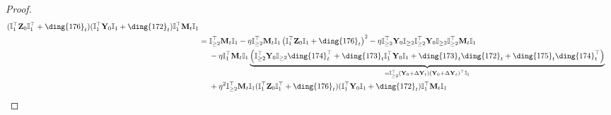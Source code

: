 \documentclass{article}
\theoremstyle{plain}
\theoremstyle{remark}
\def\bY{\mathbf{Y}}
\def\bZ{\mathbf{Z}}
\newcommand{\cc}[1]{\text{\ding{\number\numexpr#1 + 171\relax}}}
\begin{document}
\begin{proof}
\begin{align*}
            (\mathbb{I}_{1}^\top\bZ_0\mathbb{I}_1^\top+\cc{5}_t)
            (\mathbb{I}_{1}^\top\bY_0\mathbb{I}_{1}+\cc{1}_t)\mathbb{I}_{1}^\top\mathbf{M}_{t}\mathbb{I}_{1}
        \\
        &=
            \mathbb{I}_{\ge2}^\top\mathbf{M}_{t}\mathbb{I}_{1}
            - \eta\mathbb{I}_{\ge2}^\top \mathbf{M}_{t}\mathbb{I}_{1}\left(\mathbb{I}_{1}^\top\bZ_0\mathbb{I}_{1}+\cc{5}_t\right)^2
            - \eta \mathbb{I}_{\ge2}^\top \bY_0 \mathbb{I}_{\ge2}\mathbb{I}_{\ge2}^\top \bY_0\mathbb{I}_{\ge 2}\mathbb{I}_{\ge 2}^\top\mathbf{M}_{t} \mathbb{I}_{1}
            \\
            &~~~~
            - \eta \mathbb{I}_{1}^\top\mathbf{M}_{t} \mathbb{I}_{1}\underbrace{\left(\mathbb{I}_{\ge2}^\top \bY_0 \mathbb{I}_{\ge2}\cc{3}_t^\top+\cc{2}_t \mathbb{I}_{1}^\top\bY_0\mathbb{I}_{1}+\cc{2}_t \cc{1}_t+ \cc{4}_t\cc{3}_t^\top\right)}_{=\mathbb{I}_{\ge2}^\top\left(\bY_0+\Delta\bY_t\right)\left(\bY_0+\Delta\bY_t\right)^\top\mathbb{I}_{1}}
            \\
            &~~~~
            + \eta^2 \mathbb{I}_{\ge2}^\top\mathbf{M}_{t}\mathbb{I}_{1}
            (\mathbb{I}_{1}^\top\bZ_0\mathbb{I}_1^\top+\cc{5}_t)
            (\mathbb{I}_{1}^\top\bY_0\mathbb{I}_{1}+\cc{1}_t)\mathbb{I}_{1}^\top\mathbf{M}_{t}\mathbb{I}_{1}
    \end{align*}


\end{proof}
\end{document}
